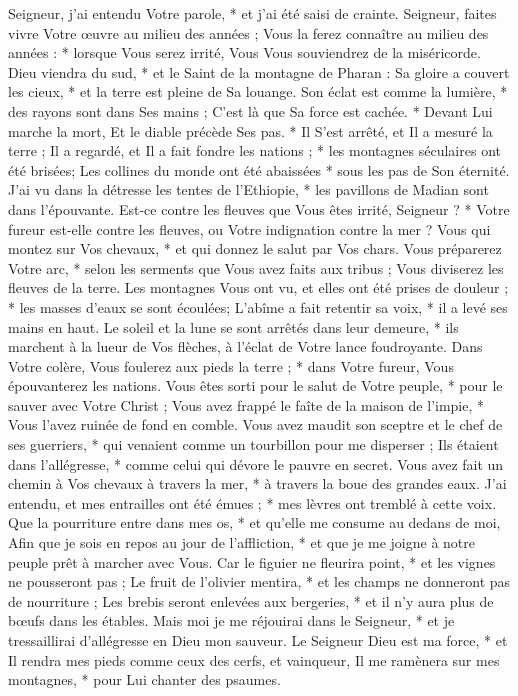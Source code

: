 Seigneur, j'ai entendu Votre parole, * et j'ai été saisi de crainte.
\versseparator
Seigneur, faites vivre Votre œuvre au milieu des années ;
\versseparator
Vous la ferez connaître au milieu des années : * lorsque Vous serez irrité, Vous Vous souviendrez de la miséricorde.
\versseparator
Dieu viendra du sud, * et le Saint de la montagne de Pharan :
\versseparator
Sa gloire a couvert les cieux, * et la terre est pleine de Sa louange.
\versseparator
Son éclat est comme la lumière, * des rayons sont dans Ses mains ;
\versseparator
C'est là que Sa force est cachée. * Devant Lui marche la mort,
\versseparator
Et le diable précède Ses pas. * Il S'est arrêté, et Il a mesuré la terre ;
\versseparator
Il a regardé, et Il a fait fondre les nations ; * les montagnes séculaires ont été brisées;
\versseparator
Les collines du monde ont été abaissées * sous les pas de Son éternité.
\versseparator
J'ai vu dans la détresse les tentes de l'Ethiopie, * les pavillons de Madian sont dans l'épouvante.
\versseparator
Est-ce contre les fleuves que Vous êtes irrité, Seigneur ? * Votre fureur est-elle contre les fleuves, ou Votre indignation contre la mer ?
\versseparator
Vous qui montez sur Vos chevaux, * et qui donnez le salut par Vos chars.
\versseparator
Vous préparerez Votre arc, * selon les serments que Vous avez faits aux tribus ;
\versseparator
Vous diviserez les fleuves de la terre. Les montagnes Vous ont vu, et elles ont été prises de douleur ; * les masses d'eaux se sont écoulées;
\versseparator
L'abîme a fait retentir sa voix, * il a levé ses mains en haut.
\versseparator
Le soleil et la lune se sont arrêtés dans leur demeure, * ils marchent à la lueur de Vos flèches, à l'éclat de Votre lance foudroyante.
\versseparator
Dans Votre colère, Vous foulerez aux pieds la terre ; * dans Votre fureur, Vous épouvanterez les nations.
\versseparator
Vous êtes sorti pour le salut de Votre peuple, * pour le sauver avec Votre Christ ;
\versseparator
Vous avez frappé le faîte de la maison de l'impie, * Vous l'avez ruinée de fond en comble.
\versseparator
Vous avez maudit son sceptre et le chef de ses guerriers, * qui venaient comme un tourbillon pour me disperser ;
\versseparator
Ils étaient dans l'allégresse, * comme celui qui dévore le pauvre en secret.
\versseparator
Vous avez fait un chemin à Vos chevaux à travers la mer, * à travers la boue des grandes eaux.
\versseparator
J'ai entendu, et mes entrailles ont été émues ; * mes lèvres ont tremblé à cette voix.
\versseparator
Que la pourriture entre dans mes os, * et qu'elle me consume au dedans de moi,
\versseparator
Afin que je sois en repos au jour de l'affliction, * et que je me joigne à notre peuple prêt à marcher avec Vous.
\versseparator
Car le figuier ne fleurira point, * et les vignes ne pousseront pas ;
\versseparator
Le fruit de l'olivier mentira, * et les champs ne donneront pas de nourriture ;
\versseparator
Les brebis seront enlevées aux bergeries, * et il n'y aura plus de bœufs dans les étables.
\versseparator
Mais moi je me réjouirai dans le Seigneur, * et je tressaillirai d'allégresse en Dieu mon sauveur.
\versseparator
Le Seigneur Dieu est ma force, * et Il rendra mes pieds comme ceux des cerfs, et vainqueur,
\versseparator
Il me ramènera sur mes montagnes, * pour Lui chanter des psaumes.